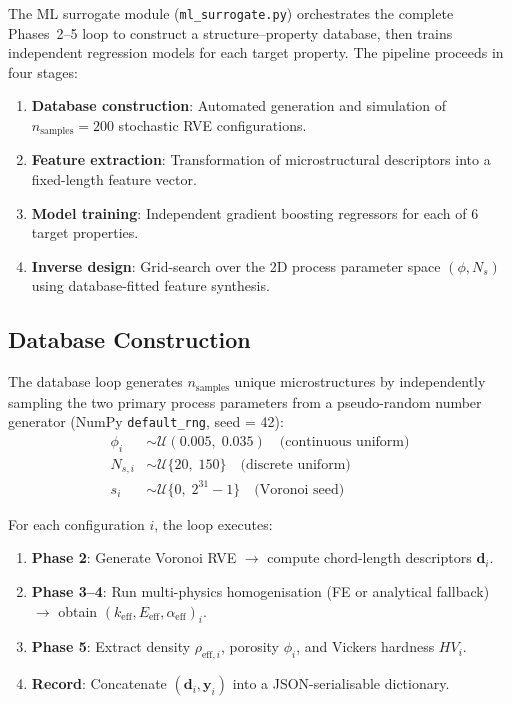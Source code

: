 \documentclass[11pt,a4paper]{article}
\begin{document}
The ML surrogate module (\texttt{ml\_surrogate.py}) orchestrates the complete Phases~2--5 loop to construct a structure--property database, then trains independent regression models for each target property. The pipeline proceeds in four stages:

\begin{enumerate}
    \item \textbf{Database construction}: Automated generation and simulation of $n_{\text{samples}} = 200$ stochastic RVE configurations.
    \item \textbf{Feature extraction}: Transformation of microstructural descriptors into a fixed-length feature vector.
    \item \textbf{Model training}: Independent gradient boosting regressors for each of 6 target properties.
    \item \textbf{Inverse design}: Grid-search over the 2D process parameter space $(\phi, N_s)$ using database-fitted feature synthesis.
\end{enumerate}

\subsection{Database Construction}
\label{sec:database}

The database loop generates $n_{\text{samples}}$ unique microstructures by independently sampling the two primary process parameters from a pseudo-random number generator (NumPy \texttt{default\_rng}, seed = 42):
\begin{align}
    \phi_i &\sim \mathcal{U}(0.005,\; 0.035) \quad \text{(continuous uniform)} \\
    N_{s,i} &\sim \mathcal{U}\{20,\; 150\} \quad \text{(discrete uniform)} \\
    s_i &\sim \mathcal{U}\{0,\; 2^{31}-1\} \quad \text{(Voronoi seed)}
\end{align}

For each configuration $i$, the loop executes:
\begin{enumerate}
    \item \textbf{Phase 2}: Generate Voronoi RVE $\to$ compute chord-length descriptors $\mathbf{d}_i$.
    \item \textbf{Phase 3--4}: Run multi-physics homogenisation (FE or analytical fallback) $\to$ obtain $(k_{\text{eff}}, E_{\text{eff}}, \alpha_{\text{eff}})_i$.
    \item \textbf{Phase 5}: Extract density $\rho_{\text{eff},i}$, porosity $\phi_i$, and Vickers hardness $HV_i$.
    \item \textbf{Record}: Concatenate $(\mathbf{d}_i, \mathbf{y}_i)$ into a JSON-serialisable dictionary.
\end{enumerate}
\end{document}
